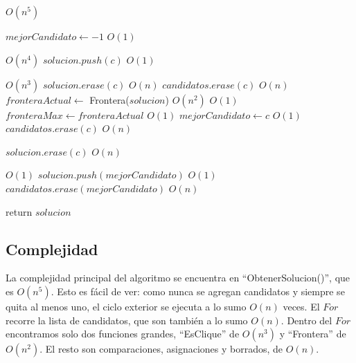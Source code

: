 \begin{algorithm}[H]
\begin{algorithmic}

                 \Comment $O(n^5)$

        \State $mejorCandidato \gets -1$            \Comment $O(1)$

                            \Comment $O(n^4)$
            \State $solucion.push(c)$               \Comment $O(1)$

                                    \Comment $O(n^3)$
                \State $solucion.erase(c)$                          \Comment $O(n)$
                \State $candidatos.erase(c)$                        \Comment $O(n)$
            \Else
                \State $fronteraActual \gets$ Frontera($solucion$)  \Comment $O(n^2)$
                              \Comment $O(1)$
                    \State $fronteraMax \gets fronteraActual$       \Comment $O(1)$
                    \State $mejorCandidato \gets c$                 \Comment $O(1)$
                \Else
                    \State $candidatos.erase(c)$                    \Comment $O(n)$
                \EndIf

                \State $solucion.erase(c)$                          \Comment $O(n)$
            \EndIf
        \EndFor

                                       \Comment $O(1)$
            \State $solucion.push(mejorCandidato)$                  \Comment $O(1)$
            \State $candidatos.erase(mejorCandidato)$               \Comment $O(n)$

        \EndIf
    \EndWhile

    \State return $solucion$

\EndFunction

\end{algorithmic}
\end{algorithm}

\subsection{Complejidad}

La complejidad principal del algoritmo se encuentra en ``ObtenerSolucion()'', que es $O(n^5)$. Esto es fácil de ver: como nunca se agregan candidatos y siempre se quita al menos uno, el ciclo exterior se ejecuta a lo sumo $O(n)$ veces. El $For$ recorre la lista de candidatos, que son también a lo sumo $O(n)$. Dentro del $For$ encontramos solo dos funciones grandes, ``EsClique'' de $O(n^3)$ y ``Frontera'' de $O(n^2)$. El resto son comparaciones, asignaciones y borrados, de $O(n)$. \\

